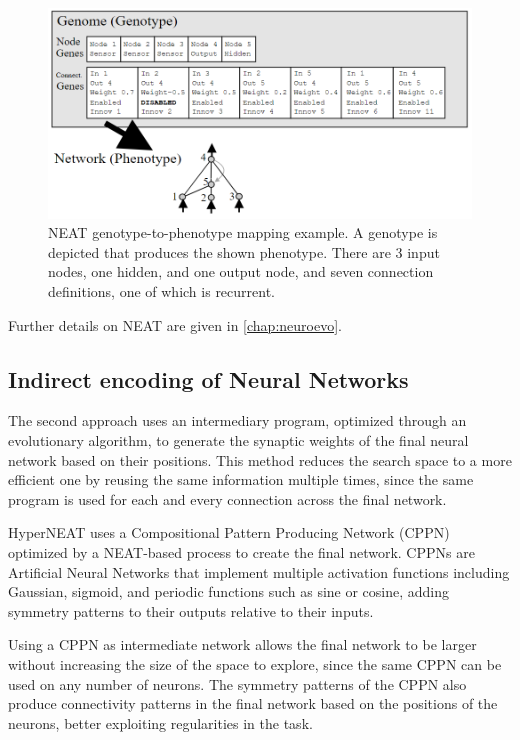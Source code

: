 \begin{figure}[H]
 \centering
 \captionsetup{justification=centering, margin=0.5cm}
 \includegraphics[width=14cm]{images/neat.png}
 \caption{\label{NEAT}NEAT genotype-to-phenotype mapping example. A genotype is depicted that produces the shown phenotype. There are 3 input nodes, one hidden, and one output node, and seven connection definitions, one of which is recurrent. \cite{NEAT_2}}
 \label{fig:NEAT}
\end{figure}

Further details on NEAT are given in \ref{chap:neuroevo}.

\subsection{Indirect encoding of Neural Networks}

The second approach uses an intermediary program, optimized through an evolutionary algorithm, to generate the synaptic weights of the final neural network based on their positions. This method reduces the search space to a more efficient one by reusing the same information multiple times, since the same program is used for each and every connection across the final network. 

HyperNEAT \cite{HyperNEAT} uses a Compositional Pattern Producing Network (CPPN) \cite{CPPN} optimized by a NEAT-based process to create the final network. CPPNs are Artificial Neural Networks that implement multiple activation functions including Gaussian, sigmoid, and periodic functions such as sine or cosine, adding symmetry patterns to their outputs relative to their inputs.

Using a CPPN as intermediate network allows the final network to be larger without increasing the size of the space to explore, since the same CPPN can be used on any number of neurons. The symmetry patterns of the CPPN also produce connectivity patterns in the final network based on the positions of the neurons, better exploiting regularities in the task.

